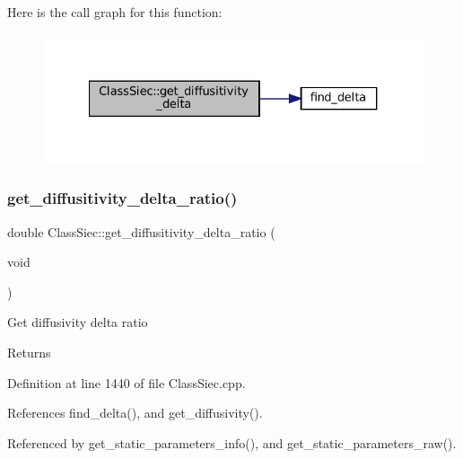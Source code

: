 Here is the call graph for this function\+:\nopagebreak
\begin{figure}[H]
\begin{center}
\leavevmode
\includegraphics[width=327pt]{classClassSiec_a5d81d2e727712fbb0f6f596eee09f354_cgraph}
\end{center}
\end{figure}
\mbox{\label{classClassSiec_ac410df30c33bfc1e1613390446e716db}} 
\subsubsection{\texorpdfstring{get\+\_\+diffusitivity\+\_\+delta\+\_\+ratio()}{get\_diffusitivity\_delta\_ratio()}}
{\footnotesize\ttfamily double Class\+Siec\+::get\+\_\+diffusitivity\+\_\+delta\+\_\+ratio (\begin{DoxyParamCaption}\item[{void}]{ }\end{DoxyParamCaption})}

Get diffusivity delta ratio \begin{DoxyReturn}{Returns}

\end{DoxyReturn}


Definition at line 1440 of file Class\+Siec.\+cpp.



References find\+\_\+delta(), and get\+\_\+diffusivity().



Referenced by get\+\_\+static\+\_\+parameters\+\_\+info(), and get\+\_\+static\+\_\+parameters\+\_\+raw().

